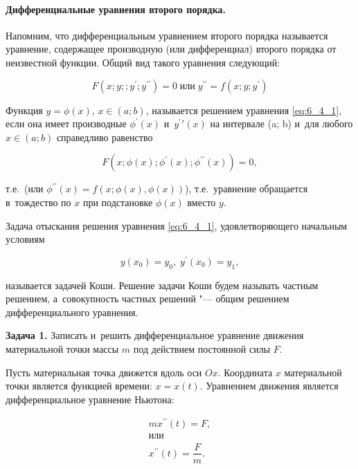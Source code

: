 
\paragraph{Дифференциальные уравнения второго порядка.}
Напомним, что дифференциальным уравнением второго порядка называется уравнение,
содержащее производную (или дифференциал) второго порядка от неизвестной функции.
Общий вид такого уравнения следующий:

\begin{equation}\label{eq:6_4_1}
F(x; y;; y^\prime; y^{\prime\prime}) = 0 \; \text{или} \; 
y^{\prime\prime} = f(x; y; y^\prime)
\end{equation}

\noindent
Функция $y = \phi(x), \, x \in (a; b)$, называется решением уравнения \eqref{eq:6_4_1},
если она имеет производные $\phi^\prime(x)$ и~$y^\prime\prime(x)$ на интервале (a; b)
и~для любого $x \in (a; b)$ справедливо равенство

\begin{equation*}
F(x; \phi(x); \phi^\prime(x); \phi^{\prime\prime} (x)) = 0,
\end{equation*}

\noindent
т.е.\ (или $\phi^{\prime\prime} (x) = f(x; \phi(x), \phi(x))$),
т.е.\ уравнение обращается в~тождество по $x$ при подстановке $\phi(x)$ вместо $y$.

Задача отыскания решения уравнения \eqref{eq:6_4_1}, удовлетворяющего начальным условиям

\begin{equation}\label{eq:6_4_2}
y(x_{0}) = y_{0}, \; y^\prime(x_{0}) = y_{1},
\end{equation}

\noindent
называется задачей Коши.
Решение задачи Коши будем называть частным решением, а~совокупность частных решений
"--- общим решением дифференциального уравнения.

\textbf{Задача 1.}\label{ex:6_4_1} Записать и~решить дифференциальное уравнение
движения материальной точки массы $m$ под действием постоянной силы $F$.

Пусть материальная точка движется вдоль оси $Ox$. Координата $x$ материальной точки
является функцией времени: $x = x(t)$. Уравнением движения является дифференциальное
уравнение Ньютона:

\begin{gather*}
mx^{\prime\prime} (t) = F, \\
\text{или}\\
x^{\prime\prime} (t) = \dfrac{F}{m}.
\end{gather*}

